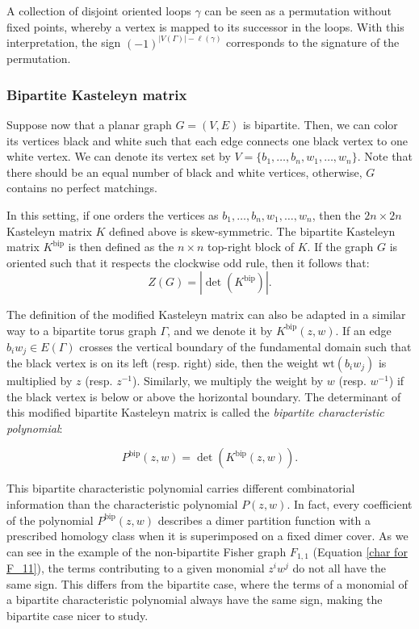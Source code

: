 \documentclass[12pt,a4paper]{article}
\theoremstyle{definition}
\def\wt{\mathrm {wt}}
\begin{document}
A collection of disjoint oriented loops $\gamma$ can be seen as a permutation without fixed points, whereby a vertex is mapped to its successor in the loops. With this interpretation, the sign $(-1)^{|V(\Gamma)|-\ell(\gamma)}$ corresponds to the signature of the permutation.

\subsubsection*{Bipartite Kasteleyn matrix}

Suppose now that a planar graph $G = (V,E)$ is bipartite. Then, we can color its vertices black and white such that each edge connects one black vertex to one white vertex. We can denote its vertex set by $V = \{b_1, \dots, b_n, w_1, \dots, w_n\}$. Note that there should be an equal number of black and white vertices, otherwise, $G$ contains no perfect matchings. 

In this setting, if one orders the vertices as $b_1, \dots, b_n, w_1, \dots, w_n$, then the $2n \times 2n$ Kasteleyn matrix $K$ defined above is skew-symmetric. The bipartite Kasteleyn matrix $K^{\mathrm{bip}}$ is then defined as the $n \times n$ top-right block of $K$. If the graph $G$ is oriented such that it respects the clockwise odd rule, then it follows that:
\[Z(G) = |\det(K^{\mathrm{bip}})|.\]

The definition of the modified Kasteleyn matrix can also be adapted in a similar way to a bipartite torus graph $\Gamma$, and we denote it by $K^{\mathrm{bip}}(z,w)$. If an edge $b_iw_j \in E(\Gamma)$ crosses the vertical boundary of the fundamental domain such that the black vertex
is on its left (resp. right) side, then the weight $\wt(b_iw_j)$ is multiplied by $z$ (resp. $z^{-1}$). Similarly, we multiply the weight by $w$ (resp. $w^{-1}$) if the black vertex is below or above the horizontal boundary. The determinant of this modified bipartite Kasteleyn matrix is called the \emph{bipartite characteristic polynomial}:

\[P^{\mathrm{bip}}(z,w) = \det(K^{\mathrm{bip}}(z,w)).\]

This bipartite characteristic polynomial carries different combinatorial information than the characteristic polynomial $P(z,w)$. In fact, every coefficient of the polynomial $P^{\mathrm{bip}}(z,w)$ describes a dimer partition function with a prescribed homology class when it is superimposed on a fixed dimer cover. As we can see in the example of the non-bipartite Fisher graph $F_{1,1}$ (Equation \ref{char for F_11}), the terms contributing to a given monomial $z^iw^j$ do not all have the same sign. This differs from the bipartite case, where the terms of a monomial of a bipartite characteristic polynomial always have the same sign, making the bipartite case nicer to study.
\end{document}
